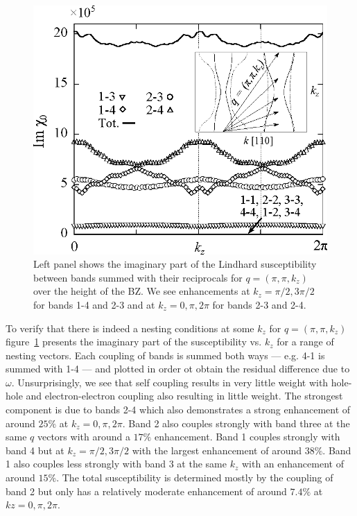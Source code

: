 \begin{figure}[htbp]
    \begin{center}
        \includegraphics[scale=0.7]{Chapter-dHvABaFe2P2/Figures/Susceptibility/NestingVector/NestingVector}
        \caption{Left panel shows the imaginary part of the Lindhard susceptibility between bands summed with their reciprocals for $q=(\pi, \pi, k_z)$ over the height of the \ac{BZ}. We see enhancements at $k_z=\pi/2,3\pi/2$ for bands 1-4 and 2-3 and at $k_z=0,\pi,2\pi$ for bands 2-3 and 2-4.}
        \label{Fig:ResD:NestingVector}
    \end{center}
\end{figure}
To verify that there is indeed a nesting conditions at some $k_z$ for $q=(\pi, \pi, k_z)$ figure~\ref{Fig:ResD:NestingVector} presents the imaginary part of the susceptibility vs. $k_z$ for a range of nesting vectors. Each coupling of bands is summed both ways --- e.g. 4-1 is summed with 1-4 --- and plotted in order ot obtain the residual difference due to $\omega$. Unsurprisingly, we see that self coupling results in very little weight with hole-hole and electron-electron coupling also resulting in little weight. The strongest component is due to bands 2-4 which also demonstrates a strong enhancement of around $25\%$ at $k_z=0,\pi,2\pi$. Band 2 also couples strongly with band three at the same $q$ vectors with around a $17\%$ enhancement. Band 1 couples strongly with band 4 but at $k_z=\pi/2,3\pi/2$ with the largest enhancement of around $38\%$. Band 1 also couples less strongly with band $3$ at the same $k_z$ with an enhancement of around $15\%$. The total susceptibility is determined mostly by the coupling of band 2 but only has a relatively moderate enhancement of around $7.4\%$ at $kz=0,\pi,2\pi$.

